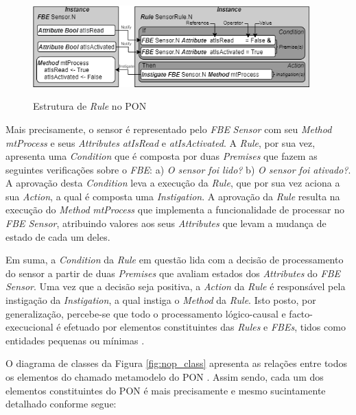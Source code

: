 \begin{figure}[!htb]
  \centering
  \caption{Estrutura de \textit{Rule} no PON}
  \includegraphics[width=0.95\textwidth]{../figures/rule_sensor_icist.png}
  \smallskip\smallskip\smallskip {}
  \label{fig:nop_rule}
\end{figure}

Mais precisamente, o sensor é representado pelo \textit{FBE} \textit{Sensor} com
seu \textit{Method} \textit{mtProcess} e seus \textit{Attributes}
\textit{atIsRead} e \textit{atIsActivated}. A \textit{Rule}, por sua vez,
apresenta uma \textit{Condition} que é composta por duas \textit{Premises} que
fazem as seguintes verificações sobre o \textit{FBE}: a) \textit{O sensor foi
  lido?} b) \textit{O sensor foi ativado?}. A aprovação desta \textit{Condition}
leva a execução da \textit{Rule}, que por sua vez aciona a sua \textit{Action},
a qual é composta uma \textit{Instigation}. A aprovação da \textit{Rule} resulta
na execução do \textit{Method} \textit{mtProcess} que implementa a
funcionalidade de processar no \textit{FBE Sensor}, atribuindo valores aos seus
\textit{Attributes} que levam a mudança de estado de cada um deles.

Em suma, a \textit{Condition} da \textit{Rule} em questão lida com a decisão de
processamento do sensor a partir de duas \textit{Premises} que avaliam estados
dos \textit{Attributes} do \textit{FBE Sensor}. Uma vez que a decisão seja
positiva, a \textit{Action} da \textit{Rule} é responsável pela instigação da
\textit{Instigation}, a qual instiga o \textit{Method} da \textit{Rule}. Isto
posto, por generalização, percebe-se que todo o processamento lógico-causal e
facto-execucional é efetuado por elementos constituintes das \textit{Rules} e
\textit{FBEs}, tidos como entidades pequenas ou mínimas
\cite{pat_simao_2008,simao_2009,doc_Kerschbaumer_2018}.

O diagrama de classes da Figura \ref{fig:nop_class} apresenta as relações entre
todos os elementos do chamado metamodelo do PON
\cite{simao_2009,msc_Ronszcka_2012,simao_2012a}. Assim sendo, cada um dos
elementos constituintes do PON é mais precisamente e mesmo sucintamente
detalhado conforme segue:

